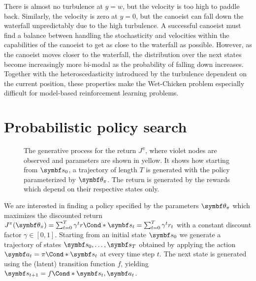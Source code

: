 There is almost no turbulence at $y = w$, but the velocity is too high to paddle back.
Similarly, the velocity is zero at $y = 0$, but the canoeist can fall down the waterfall unpredictably due to the high turbulence.
A successful canoeist must find a balance between handling the stochasticity and velocities within the capabilities of the canoeist to get as close to the waterfall as possible.
However, as the canoeist moves closer to the waterfall, the distribution over the next states become increasingly more bi-modal as the probability of falling down increases.
Together with the heteroscedasticity introduced by the turbulence dependent on the current position, these properties make the Wet-Chicken problem especially difficult for model-based reinforcement learning problems.


\section{Probabilistic policy search}
\label{toc:interpretable_rl:probabilistic_policy_search}
\begin{figure}[t]
    \centering
    
    \caption{
        \label{fig:interpretable_rl:graphical_model:rl}
        The generative process for the return $J^\pi$, where violet nodes are observed and parameters are shown in yellow.
        It shows how starting from $\mat{s}_0$, a trajectory of length $T$ is generated with the policy parameterized by $\mat{\theta}_\pi$.
        The return is generated by the rewards which depend on their respective states only.
    }
\end{figure}
We are interested in finding a policy specified by the parameters $\mat{\theta}_\pi$ which maximizes the discounted return
$J^\pi(\mat{\theta}_\pi) = \sum_{t=0}^T \gamma^t \Fun*{r}{\mat{s}_t} = \sum_{t=0}^T \gamma^t r_t$ with a constant discount factor $\gamma \in [0, 1]$.
Starting from an initial state $\mat{s}_0$ we generate a trajectory of states $\mat{s}_0, \ldots, \mat{s}_T$ obtained by applying the action $\mat{a}_t = \Fun*{\pi}{\mat{s}_t}$ at every time step $t$.
The next state is generated using the (latent) transition function $f$, yielding $\mat{s}_{t+1} = \Fun*{f}{\mat{s}_t, \mat{a}_t}$.

